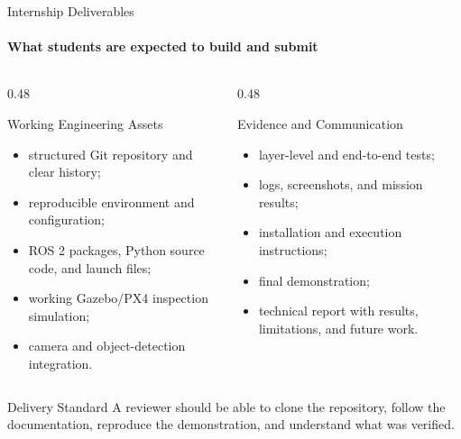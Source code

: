 \begin{frame}{Internship Deliverables}
    \framesubtitle{What students are expected to build and submit}
    \footnotesize
    \begin{columns}[T,onlytextwidth]
        \begin{column}{0.48\textwidth}
            \begin{block}{Working Engineering Assets}
                \begin{itemize}
                    \setlength{\itemsep}{0.22em}
                    \item structured Git repository and clear history;
                    \item reproducible environment and configuration;
                    \item ROS 2 packages, Python source code, and launch files;
                    \item working Gazebo/PX4 inspection simulation;
                    \item camera and object-detection integration.
                \end{itemize}
            \end{block}
        \end{column}
        \begin{column}{0.48\textwidth}
            \begin{exampleblock}{Evidence and Communication}
                \begin{itemize}
                    \setlength{\itemsep}{0.22em}
                    \item layer-level and end-to-end tests;
                    \item logs, screenshots, and mission results;
                    \item installation and execution instructions;
                    \item final demonstration;
                    \item technical report with results, limitations, and future work.
                \end{itemize}
            \end{exampleblock}
        \end{column}
    \end{columns}
    \begin{alertblock}{Delivery Standard}
        A reviewer should be able to clone the repository, follow the documentation, reproduce the demonstration, and understand what was verified.
    \end{alertblock}
\end{frame}

